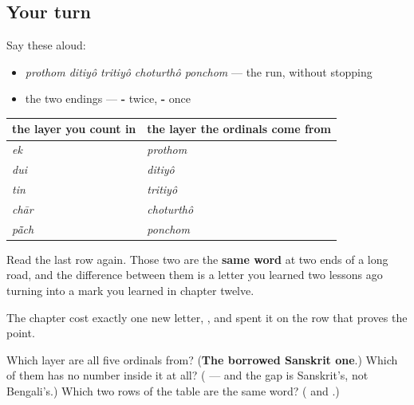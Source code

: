 \subsection*{Your turn}
Say these aloud:

\begin{itemize}
\raggedright
  \item \emph{prothom ditiyô tritiyô choturthô ponchom} — the run, without stopping
  \item the two endings — \textbf{-} twice, \textbf{-} once
\end{itemize}

\begin{grammarlens}[title={What you've built this chapter, in one table}]
\noindent
\begin{tabularx}{\linewidth}{@{}>{\raggedright\arraybackslash}X>{\raggedright\arraybackslash}X@{}}
\toprule
\textbf{the layer you count in} & \textbf{the layer the ordinals come from} \\
\midrule
\textbf{\bn{এক}} \emph{ek} & \textbf{\bn{প্রথম}} \emph{prothom} \\
\textbf{\bn{দুই}} \emph{dui} & \textbf{\bn{দ্বিতীয়}} \emph{ditiyô} \\
\textbf{\bn{তিন}} \emph{tin} & \textbf{\bn{তৃতীয়}} \emph{tritiyô} \\
\textbf{\bn{চার}} \emph{chār} & \textbf{\bn{চতুর্থ}} \emph{choturthô} \\
\textbf{\bn{পাঁচ}} \emph{pā̃ch} & \textbf{\bn{পঞ্চম}} \emph{ponchom} \\
\bottomrule
\end{tabularx}

Read the last row again. Those two are the \textbf{same word} at two ends of a long road, and the difference between them is a letter you learned two lessons ago turning into a mark you learned in chapter twelve.

The chapter cost exactly one new letter, \textbf{}, and spent it on the row that proves the point.
\end{grammarlens}

\begin{tcolorbox}[breakable,colback=teal!4,colframe=teal!35!black,title={Before you move on}]
Which layer are all five ordinals from? (\textbf{The borrowed Sanskrit one}.) Which of them has no number inside it at all? (\textbf{} — and the gap is Sanskrit's, not Bengali's.) Which two rows of the table are the same word? (\textbf{} and \textbf{}.)
\end{tcolorbox}
